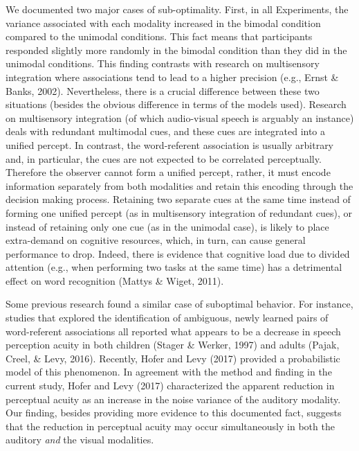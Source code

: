 \documentclass[english,floatsintext,man]{apa6}
\theoremstyle{definition}
\theoremstyle{definition}
\theoremstyle{definition}
\theoremstyle{remark}
\begin{document}
We documented two major cases of sub-optimality. First, in all
Experiments, the variance associated with each modality increased in the
bimodal condition compared to the unimodal conditions. This fact means
that participants responded slightly more randomly in the bimodal
condition than they did in the unimodal conditions. This finding
contrasts with research on multisensory integration where associations
tend to lead to a higher precision (e.g., Ernst \& Banks, 2002).
Nevertheless, there is a crucial difference between these two situations
(besides the obvious difference in terms of the models used). Research
on multisensory integration (of which audio-visual speech is arguably an
instance) deals with redundant multimodal cues, and these cues are
integrated into a unified percept. In contrast, the word-referent
association is usually arbitrary and, in particular, the cues are not
expected to be correlated perceptually. Therefore the observer cannot
form a unified percept, rather, it must encode information separately
from both modalities and retain this encoding through the decision
making process. Retaining two separate cues at the same time instead of
forming one unified percept (as in multisensory integration of redundant
cues), or instead of retaining only one cue (as in the unimodal case),
is likely to place extra-demand on cognitive resources, which, in turn,
can cause general performance to drop. Indeed, there is evidence that
cognitive load due to divided attention (e.g., when performing two tasks
at the same time) has a detrimental effect on word recognition (Mattys
\& Wiget, 2011).

Some previous research found a similar case of suboptimal behavior. For
instance, studies that explored the identification of ambiguous, newly
learned pairs of word-referent associations all reported what appears to
be a decrease in speech perception acuity in both children (Stager \&
Werker, 1997) and adults (Pajak, Creel, \& Levy, 2016). Recently, Hofer
and Levy (2017) provided a probabilistic model of this phenomenon. In
agreement with the method and finding in the current study, Hofer and
Levy (2017) characterized the apparent reduction in perceptual acuity as
an increase in the noise variance of the auditory modality. Our finding,
besides providing more evidence to this documented fact, suggests that
the reduction in perceptual acuity may occur simultaneously in both the
auditory \emph{and} the visual modalities.
\end{document}
